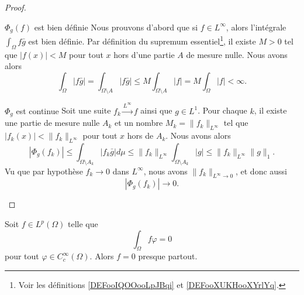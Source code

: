 \begin{proof}
\begin{subproof}
            \begin{subproof}
                \item[\( \Phi_g(f)\) est bien définie]
                    Nous prouvons d'abord que si \( f\in L^{\infty}\), alors l'intégrale \( \int_{\Omega}f\bar g\) est bien définie. Par définition du supremum essentiel\footnote{Voir les définitions \ref{DEFooIQOOooLpJBqi} et \ref{DEFooXUKHooXYrlYq}.}, il existe \( M>0\) tel que \( | f(x) |<M\) pour tout \( x\) hors d'une partie \( A\) de mesure nulle. Nous avons alors
                    \begin{equation}
                        \int_{\Omega}|f\bar g|=\int_{\Omega\setminus A}| f\bar g |\leq M\int_{\Omega\setminus A}| f |= M\int_{\Omega}| f |<\infty.
                    \end{equation}
                \item[\( \Phi_g\) est continue]
                    Soit une suite \( f_k\stackrel{L^{\infty}}{\longrightarrow}f\) ainsi que \( g\in L^1\). Pour chaque \( k\), il existe une partie de mesure nulle \( A_k\) et un nombre \( M_k=\| f_k \|_{L^{\infty}}\) tel que \( | f_k(x) |<\| f_k \|_{L^{\infty}}\) pour tout \( x\) hors de \( A_k\). Nous avons alors
                    \begin{equation}
                        | \Phi_g(f_k) |\leq \int_{\Omega\setminus A_k}| f_k\bar g |d\mu\leq \| f_k \|_{L^{\infty}}\int_{\Omega\setminus A_k}| g |\leq \| f_k \|_{L^{\infty}}\| g \|_1.
                    \end{equation}
                    Vu que par hypothèse \( f_k\to 0\) dans \( L^{\infty}\), nous avons \( \| f_k \|_{L^{\infty}\to 0}\), et donc aussi
                    \begin{equation}
                        |\Phi_g(f_k)|\to 0.
                    \end{equation}
            \end{subproof}
    \end{subproof}
\end{proof}

\begin{proposition} \label{PropUKLZZZh}
    Soit \( f\in L^p(\Omega)\) telle que
    \begin{equation}
        \int_{\Omega}f\varphi=0
    \end{equation}
    pour tout \( \varphi\in C^{\infty}_c(\Omega)\). Alors \( f=0\) presque partout.
\end{proposition}

